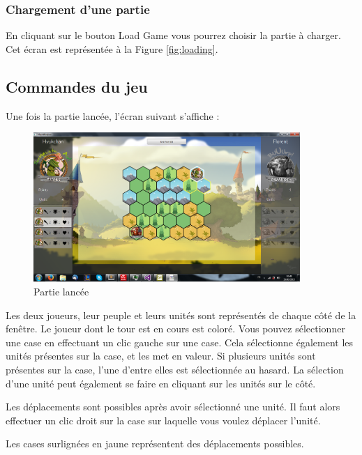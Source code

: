 \documentclass[a4paper]{article}
\begin{document}
		\newpage\subsubsection{Chargement d'une partie}
		En cliquant sur le bouton \og Load Game\fg{} vous pourrez choisir la partie à charger. Cet écran est représentée à la Figure \ref{fig:loading}.

	\subsection{Commandes du jeu}
	Une fois la partie lancée, l'écran suivant s'affiche :
		\begin{figure}[h!]
			\centering
			\includegraphics[width=0.9\textwidth]{../../IHM/partie_lancee.png}
			\caption{Partie lancée}
			\label{fig:debut_partie}
		\end{figure}

		Les deux joueurs, leur peuple et leurs unités sont représentés de chaque côté de la fenêtre.
		Le joueur dont le tour est en cours est coloré. Vous pouvez sélectionner une case en effectuant un clic gauche sur une case. Cela sélectionne également les unités présentes sur la case, et les met en valeur. Si plusieurs unités sont présentes sur la case, l'une d'entre elles est sélectionnée au hasard.
		La sélection d'une unité peut également se faire en cliquant sur les unités sur le côté.

		Les déplacements sont possibles après avoir sélectionné une unité. Il faut alors effectuer un clic droit sur la case sur laquelle vous voulez déplacer l'unité.

		Les cases surlignées en jaune représentent des déplacements possibles.
\end{document}
